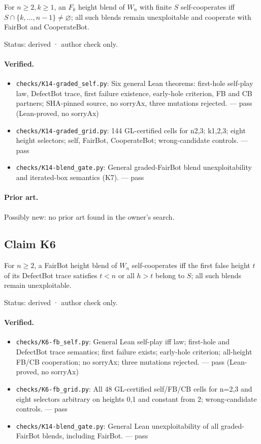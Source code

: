 \documentclass{article}
\begin{document}
For $n\ge2,k\ge1$, an $F_k$ height blend of $W_n$ with finite $S$ self-cooperates iff $S\cap\{k,\ldots,n-1\}\ne\varnothing$; all such blends remain unexploitable and cooperate with FairBot and CooperateBot.

Status: derived · author check only.

\paragraph{Verified.}
\begin{itemize}
\item \texttt{checks/K14-graded\_self.py}: Six general Lean theorems: first-hole self-play law, DefectBot trace, first failure existence, early-hole criterion, FB and CB partners; SHA-pinned source, no sorryAx, three mutations rejected. --- pass (Lean-proved, no sorryAx)
\item \texttt{checks/K14-graded\_grid.py}: 144 GL-certified cells for n2,3; k1,2,3; eight height selectors; self, FairBot, CooperateBot; wrong-candidate controls. --- pass
\item \texttt{checks/K14-blend\_gate.py}: General graded-FairBot blend unexploitability and iterated-box semantics (K7). --- pass
\end{itemize}

\paragraph{Prior art.} Possibly new: no prior art found in the owner's search.

\subsection*{Claim K6}

For $n\ge2$, a FairBot height blend of $W_n$ self-cooperates iff the first false height $t$ of its DefectBot trace satisfies $t<n$ or all $h>t$ belong to $S$; all such blends remain unexploitable.

Status: derived · author check only.

\paragraph{Verified.}
\begin{itemize}
\item \texttt{checks/K6-fb\_self.py}: General Lean self-play iff law; first-hole and DefectBot trace semantics; first failure exists; early-hole criterion; all-height FB/CB cooperation; no sorryAx; three mutations rejected. --- pass (Lean-proved, no sorryAx)
\item \texttt{checks/K6-fb\_grid.py}: All 48 GL-certified self/FB/CB cells for n=2,3 and eight selectors arbitrary on heights 0,1 and constant from 2; wrong-candidate controls. --- pass
\item \texttt{checks/K14-blend\_gate.py}: General Lean unexploitability of all graded-FairBot blends, including FairBot. --- pass
\end{itemize}
\end{document}
